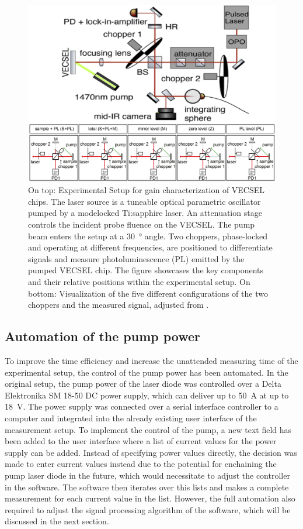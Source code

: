 \begin{figure}[ht]
    \centering
    \includegraphics[width=0.8\linewidth]{images/setup.png}
    \caption{On top: Experimental Setup for gain characterization of VECSEL chips. The laser source is a tuneable optical parametric oscillator pumped by a modelocked Ti:sapphire laser. An attenuation stage controls the incident probe fluence on the VECSEL. The pump beam enters the setup at a \qty{30}{\degree} angle. Two choppers, phase-locked and operating at different frequencies, are positioned to differentiate signals and measure photoluminescence (PL) emitted by the pumped VECSEL chip. The figure showcases the key components and their relative positions within the experimental setup.
    On bottom: Visualization of the five different configurations of the two choppers and the measured signal, adjusted from \cite{Mangold2012VECSELCharacterization}.}
    \label{fig:setup}
\end{figure}

\subsection{Automation of the pump power}{\label{subsubsection:pump}}

To improve the time efficiency and increase the unattended measuring time of the experimental setup, the control of the pump power has been automated. In the original setup, the pump power of the laser diode was controlled over a Delta Elektronika SM 18-50 DC power supply, which can deliver up to \qty{50}{\ampere} at up to \qty{18}{\volt}. The power supply was connected over a serial interface controller to a computer and integrated into the already existing user interface of the measurement setup. To implement the control of the pump, a new text field has been added to the user interface where a list of current values for the power supply can be added. Instead of specifying power values directly, the decision was made to enter current values instead due to the potential for enchaining the pump laser diode in the future, which would necessitate to adjust the controller in the software. The software then iterates over this lists and makes a complete measurement for each current value in the list. However, the full automation also required to adjust the signal processing algorithm of the software, which will be discussed in the next section. 

